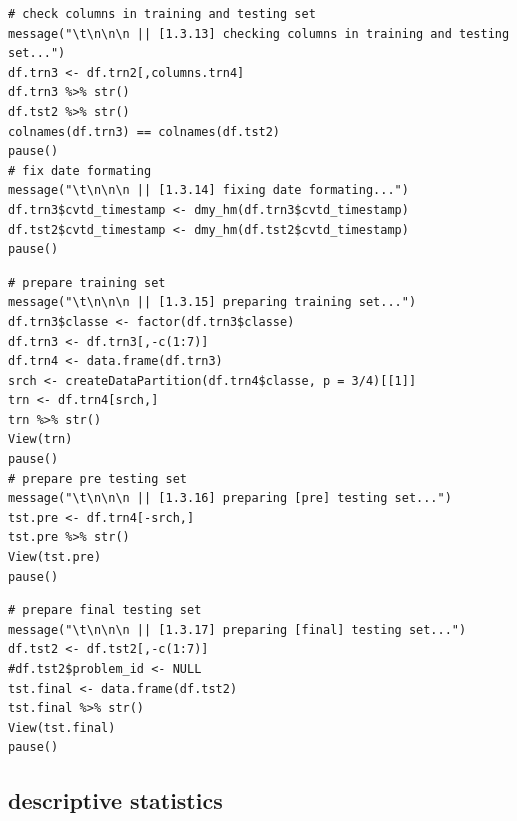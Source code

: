 \documentclass[10pt, twoside]{article}
\begin{document}
\begin{verbatim}
# check columns in training and testing set
message("\t\n\n\n || [1.3.13] checking columns in training and testing set...")
df.trn3 <- df.trn2[,columns.trn4]
df.trn3 %>% str()
df.tst2 %>% str()
colnames(df.trn3) == colnames(df.tst2)
pause()
# fix date formating
message("\t\n\n\n || [1.3.14] fixing date formating...")
df.trn3$cvtd_timestamp <- dmy_hm(df.trn3$cvtd_timestamp)
df.tst2$cvtd_timestamp <- dmy_hm(df.tst2$cvtd_timestamp)
pause()
\end{verbatim}

\begin{verbatim}
# prepare training set
message("\t\n\n\n || [1.3.15] preparing training set...")
df.trn3$classe <- factor(df.trn3$classe)
df.trn3 <- df.trn3[,-c(1:7)]
df.trn4 <- data.frame(df.trn3)
srch <- createDataPartition(df.trn4$classe, p = 3/4)[[1]]
trn <- df.trn4[srch,]
trn %>% str()
View(trn)
pause()
# prepare pre testing set
message("\t\n\n\n || [1.3.16] preparing [pre] testing set...")
tst.pre <- df.trn4[-srch,]
tst.pre %>% str()
View(tst.pre)
pause()
\end{verbatim}

\begin{verbatim}
# prepare final testing set
message("\t\n\n\n || [1.3.17] preparing [final] testing set...")
df.tst2 <- df.tst2[,-c(1:7)]
#df.tst2$problem_id <- NULL
tst.final <- data.frame(df.tst2)
tst.final %>% str()
View(tst.final)
pause()
\end{verbatim}

\begin{center}
\subsection{descriptive statistics}
\vspace{-3ex}
\end{center}
\end{document}
